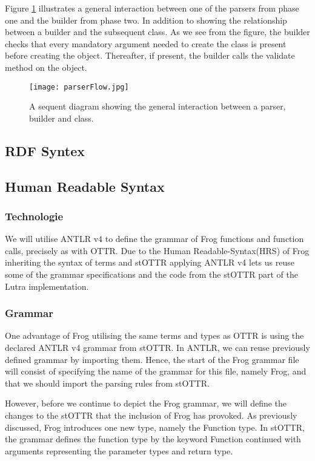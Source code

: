 \para
Figure \ref{fig:parserFlow} illustrates a general interaction between one of the parsers from phase one and the builder from phase two. In addition to showing the relationship between a builder and the subsequent class. As we see from the figure, the builder checks that every mandatory argument needed to create the class is present before creating the object. Thereafter, if present, the builder calls the validate method on the object. 

\begin{figure}
  \centering
  \texttt{[image: parserFlow.jpg]}
  \caption{A sequent diagram showing the general interaction between a parser, builder and class. }
  \label{fig:parserFlow}
\end{figure}

\subsection{RDF Syntex}
\label{implRDF}

\subsection{Human Readable Syntax}
\label{implHRS}
\subsubsection{Technologie}
We will utilise ANTLR v4 to define the grammar of Frog functions and function calls, precisely as with OTTR.  Due to the Human Readable-Syntax(HRS) of Frog inheriting the syntax of terms and stOTTR applying ANTLR v4 lets us reuse some of the grammar specifications and the code from the stOTTR part of the Lutra implementation. 

\subsubsection{Grammar}
One advantage of Frog utilising the same terms and types as OTTR is using the declared ANTLR v4 grammar from stOTTR. In ANTLR, we can reuse previously defined grammar by importing them. Hence, the start of the Frog grammar file will consist of specifying the name of the grammar for this file, namely Frog, and that we should import the parsing rules from stOTTR. 

\para



\para
However, before we continue to depict the Frog grammar, we will define the changes to the stOTTR that the inclusion of Frog has provoked. As previously discussed, Frog introduces one new type, namely the Function type. In stOTTR, the grammar defines the function type by the keyword Function continued with arguments representing the parameter types and return type.

